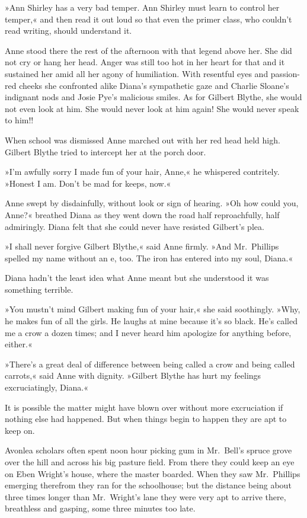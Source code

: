 »Ann Shirley has a very bad temper. Ann Shirley must learn to control her temper,« and then read it out loud so that even the primer class, who couldn't read writing, should understand it.

Anne stood there the rest of the afternoon with that legend above her. She did not cry or hang her head. Anger was still too hot in her heart for that and it sustained her amid all her agony of humiliation. With resentful eyes and passion-red cheeks she confronted alike Diana's sympathetic gaze and Charlie Sloane's indignant nods and Josie Pye's malicious smiles. As for Gilbert Blythe, she would not even look at him. She would never look at him again! She would never speak to him!!

When school was dismissed Anne marched out with her red head held high. Gilbert Blythe tried to intercept her at the porch door.

»I'm awfully sorry I made fun of your hair, Anne,« he whispered contritely. »Honest I am. Don't be mad for keeps, now.«

Anne swept by disdainfully, without look or sign of hearing. »Oh how could you, Anne?« breathed Diana as they went down the road half reproachfully, half admiringly. Diana felt that she could never have resisted Gilbert's plea.

»I shall never forgive Gilbert Blythe,« said Anne firmly. »And Mr.~Phillips spelled my name without an e, too. The iron has entered into my soul, Diana.«

Diana hadn't the least idea what Anne meant but she understood it was something terrible.

»You mustn't mind Gilbert making fun of your hair,« she said soothingly. »Why, he makes fun of all the girls. He laughs at mine because it's so black. He's called me a crow a dozen times; and I never heard him apologize for anything before, either.«

»There's a great deal of difference between being called a crow and being called carrots,« said Anne with dignity. »Gilbert Blythe has hurt my feelings excruciatingly, Diana.«

It is possible the matter might have blown over without more excruciation if nothing else had happened. But when things begin to happen they are apt to keep on.

Avonlea scholars often spent noon hour picking gum in Mr.~Bell's spruce grove over the hill and across his big pasture field. From there they could keep an eye on Eben Wright's house, where the master boarded. When they saw Mr.~Phillips emerging therefrom they ran for the schoolhouse; but the distance being about three times longer than Mr.~Wright's lane they were very apt to arrive there, breathless and gasping, some three minutes too late.

